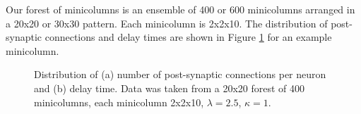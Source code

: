 Our forest of minicolumns is an ensemble of 400 or 600 minicolumns arranged in a 20x20 or 30x30 pattern.
Each minicolumn is 2x2x10.
The distribution of post-synaptic connections and delay times are shown in Figure \ref{fig:connection_delay_distrbution_forest} for an example minicolumn.
\begin{figure}[!htb]
 \caption{Distribution of (a) number of post-synaptic connections per neuron and (b) delay time. Data was taken from a 20x20 forest of 400 minicolumns, each minicolumn 2x2x10, $\lambda=2.5$, $\kappa=1$.  } 
 \label{fig:connection_delay_distrbution_forest}
\end{figure}
 \FloatBarrier



